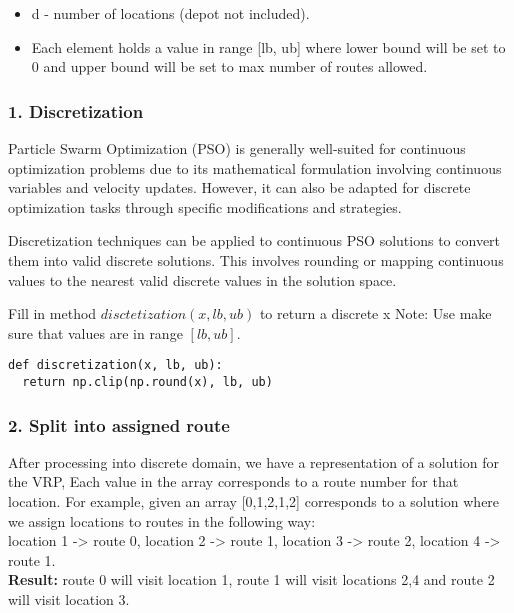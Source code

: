 \documentclass[letterpaper, 12pt]{article}
\begin{document}
\begin{itemize}
    \item d - number of locations (depot not included).
    \item Each element holds a value in range [lb, ub] where lower bound will be set to 0 and upper bound will be set to max number of routes allowed.
\end{itemize}


 \subsubsection*{1. Discretization}
Particle Swarm Optimization (PSO) is generally well-suited for continuous optimization problems due to its mathematical formulation involving continuous variables and velocity updates. However, it can also be adapted for discrete optimization tasks through specific modifications and strategies.

Discretization techniques can be applied to continuous PSO solutions to convert them into valid discrete solutions. This involves rounding or mapping continuous values to the nearest valid discrete values in the solution space.

Fill in method $disctetization(x, lb, ub)$ to return a discrete x Note: Use make sure that values are in range  $[lb,ub]$.\\

\begin{lstlisting}
def discretization(x, lb, ub):
  return np.clip(np.round(x), lb, ub)
\end{lstlisting}

 \subsubsection*{2. Split into assigned route}
After processing into discrete domain, we have a representation of a solution for the VRP, Each value in the array corresponds to a route number for that location. For example, given an array [0,1,2,1,2] corresponds to a solution where we assign locations to routes in the following way: \\

location 1 -> route 0, location 2 -> route 1, location 3 -> route 2, location 4 -> route 1.\\

\textbf{Result:} 
route 0 will visit location 1, route 1 will visit locations 2,4 and route 2 will visit location 3. \\
\end{document}
